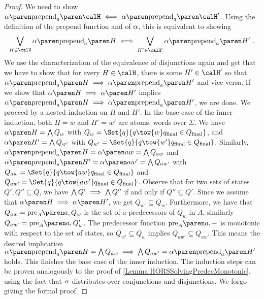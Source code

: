 \documentclass[../../diss.tex]{subfiles}
\begin{document}
\begin{proof}
    We need to show $\abs{\prepend{a}{\sof}} \lequiv \abs{\prepend{a}{\sof'}}$.
    Using the definition of the prepend function and of $\abs$, this is equivalent to showing
    \[
        \bigvee_{H \in \sof} \abs{\prepend{a}{H}} \lequiv \bigvee_{H' \in \sof'} \abs{\prepend{a}{H'}}
        \ .
    \]
    We use the characterization of the equivalence of disjunctions again and get that we have to show that for every $H \in \sof$, there is some $H' \in \sof'$ so that $\abs{\prepend{a}{H}} \lleq \abs{\prepend{a}{H'}}$ and vice versa.
    If we show that $\abs{H} \lleq \abs{H'}$ implies $\abs{\prepend{a}{H}} \lleq \abs{\prepend{a}{H'}}$, we are done.
    We proceed by a nested induction on $H$ and $H'$.
    In the base case of the inner induction, both $H = w$ and $H' = w'$ are atoms, words over $\Sigma$.
    We have $\abs{H} = \bigwedge Q_w$ with $Q_w = \Set{ q }{ q \tow{w} \qfinal \in \QF}$, and $\abs{H'} = \bigwedge Q_{w'}$ with $Q_{w'} = \Set{ q }{ q \tow{w'} \qfinal \in \QF}$.
    Similarly, $\abs{\prepend{a}{H}} = \abs{aw} = \bigwedge Q_{aw}$ and $\abs{\prepend{a}{H'}} = \abs{aw'} = \bigwedge Q_{aw'}$ with $Q_{aw} = \Set{ q }{ q \tow{aw} \qfinal \in \QF}$ and $Q_{aw'} = \Set{ q }{ q \tow{aw'} \qfinal \in \QF}$.
    Observe that for two sets of states $Q', Q'' \subseteq Q$, we have $\bigwedge Q' \implies \bigwedge Q''$ if and only if $Q'' \subseteq Q'$.
    Since we assume that $\abs{H} \lleq \abs{H'}$, we get $Q_{w'} \subseteq Q_{w}$.
    Furthermore, we have that $Q_{aw} = \pre{A}{a}{Q_w}$ is the set of $a$-predecessors of $Q_{w}$ in $A$, similarly $Q_{aw'} = \pre{A}{a}{Q_w'}$.
    The predecessor function $\pre{A}{a}{-}$ is monotonic with respect to the set of states, so $Q_{w'} \subseteq Q_{w}$ implies $Q_{aw'} \subseteq Q_{aw}$.
    This means the desired implication $\abs{\prepend{a}{H}} = \bigwedge Q_{aw} \lleq \bigwedge Q_{aw'} = \abs{\prepend{a}{H'}}$ holds.
    This finishes the base case of the inner induction.
    The induction steps can be proven analogously to the proof of \cref{Lemma:HORSSolvingPredecMonotonic}, using the fact that $\abs$ distributes over conjunctions and disjunctions.
    We forgo giving the formal proof.


\end{proof}
\end{document}
